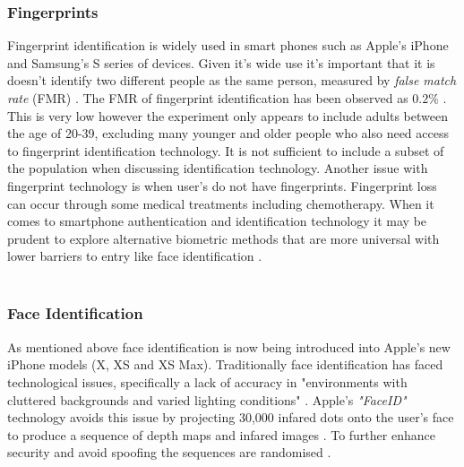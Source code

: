 \documentclass[12pt]{article}
\begin{document}
	\subsubsection{Fingerprints}
	\label{subsubsect:fingerprints}
	Fingerprint identification is widely used in smart phones such as Apple's iPhone and Samsung's S series of devices. Given it's wide use it's important that it is doesn't identify two different people as the same person, measured by \emph{false match rate} (FMR) \citep{delac2004survey}. The FMR of fingerprint identification has been observed as $0.2\%$ \citep{delac2004survey}. This is very low however the experiment only appears to include adults between the age of 20-39, excluding many younger and older people who also need access to fingerprint identification technology. It is not sufficient to include a subset of the population when discussing identification technology. Another issue with fingerprint technology is when user's do not have fingerprints. Fingerprint loss can occur through some medical treatments including chemotherapy. When it comes to smartphone authentication and identification technology it may be prudent to explore alternative biometric methods that are more universal with lower barriers to entry like face identification \citep{prabhakar2003biometric}.
	\\
	\\
	\subsubsection{Face Identification}
	\label{subsubsect:face_identification}
	As mentioned above face identification is now being introduced into Apple's new iPhone models (X, XS and XS Max). Traditionally face identification has faced technological issues, specifically a lack of accuracy in "environments with cluttered backgrounds and varied lighting conditions" \citep{prabhakar2003biometric}. Apple's \emph{"FaceID"} technology avoids this issue by projecting 30,000 infared dots onto the user's face to produce a sequence of depth maps and infared images \citep{apple_faceid_2017}. To further enhance security and avoid spoofing the sequences are randomised \citep{apple_faceid_2017}.
	\\
	\\
\end{document}
